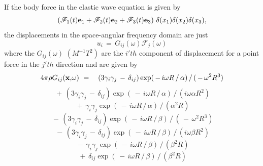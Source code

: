 \documentclass{article}
\begin{document}
If the body force in the
elastic wave equation is given by
$$
\left( \mathscr{F}_1 (t) {\bf e}_1 +  \mathscr{F}_2 (t) {\bf e}_2 +  \mathscr{F}_3 (t) {\bf e}_3 \right) \, \delta ( x_1 ) \delta ( x_2 ) \delta ( x_3 )  ,
$$
the
displacements in the space-angular frequency domain
are just
\begin{equation} \label{eq5_3_18}
u_i \,=\,  G_{ij} ( \omega ) \mathscr{F}_j ( \omega )
\end{equation}
where the $ G_{ij} ( \omega ) $ $(M^{-1} T^2 )$ are the  $i'th$ component of displacement for a point force
in the $j'th$ direction and are  given by
$$ 
4 \pi \rho G_{ij} ( {\bf x,} \omega ) \ =\    \,\,\,\,
 ( 3 \gamma_i \gamma_j \,-\, \delta_{ij} ) \exp ( \,-\, i \omega  R \,/\, \alpha ) \,/\, (  \,-\, \omega^2 R^3 ) 
$$
$$ 
\,+\, ( 3 \gamma_i \gamma_j \,-\, \delta_{ij} ) \exp (  \,-\, i \omega R \,/\, \alpha ) \,/\, ( i \omega \alpha R^2 )
$$
$$ 
\,+\, \gamma_i \gamma_j \exp ( \,-\, i \omega R \,/\, \alpha )\,/\, ( \alpha^2 R )
$$
\begin{equation} \label{eq5_3_19}
   \,-\, ( 3 \gamma_i \gamma_j \,-\, \delta_{ij} ) \exp (  \,-\, i \omega R \,/\, \beta ) \,/\, ( \,-\,\omega^2 R^3  )
\end{equation}
$$
\,-\, ( 3 \gamma_i \gamma_j \,-\, \delta_{ij} ) \exp (  \,-\, i \omega  R \,/\, \beta ) \,/\, (  i \omega \beta R^2 )
$$
$$
\left . 
\,-\,   \gamma_i \gamma_j   \exp (  \,-\, i \omega R \,/\, \beta )\,/\, ( \beta^2 R )  \right .
$$
$$
\left. 
\,+\,   \delta_{ij}   \exp (  \,-\, i \omega R \,/\, \beta )\,/\, ( \beta^2 R )  \right .
$$
\end{document}
